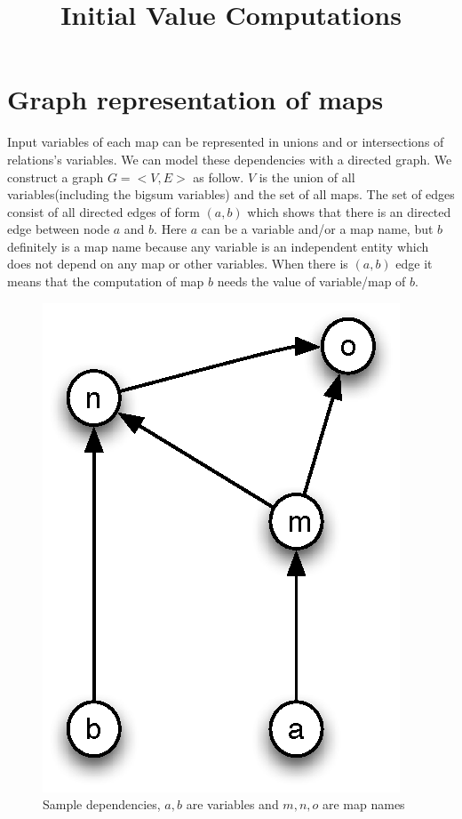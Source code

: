 \documentclass[12pt]{article}
\begin{document}
\title{Initial Value Computations}
\author{}
\date{}
\maketitle

\section{Graph representation of maps}
Input variables of each map can be represented in unions and or intersections of relations's variables. We can model these dependencies with a directed graph. We construct a graph $G=<V,E>$ as follow. $V$ is the union of all variables(including the bigsum variables) and the set of all maps. The set of edges consist of all directed edges of form $(a,b)$ which shows that there is an directed edge between node $a$ and $b$. Here $a$ can be a variable and/or a map name, but $b$ definitely is a map name because any variable is an independent entity which does not depend on any map or other variables. When there is $(a,b)$ edge it means that the computation of map $b$ needs the value of variable/map of $b$. 

\begin{figure}[htbp]
\begin{center}
\includegraphics[scale=0.8]{fig1.eps}
\caption{Sample dependencies, $a,b$ are variables and $m,n,o$ are map names}
\label{fig1}
\end{center}
\end{figure}
\end{document}
